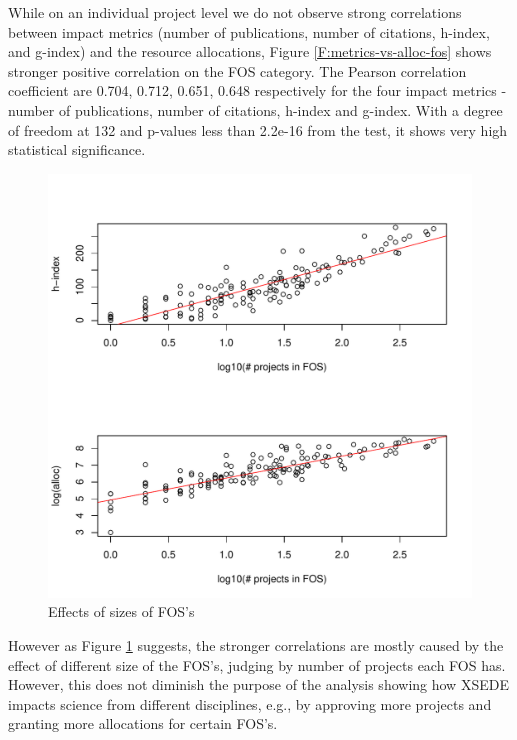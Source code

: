\documentclass{sig-alternate}
\begin{document}
While on an individual project level we do not observe strong correlations between impact metrics (number of publications, number of citations, h-index, and g-index) and the resource allocations, Figure \ref {F:metrics-vs-alloc-fos} shows stronger positive correlation on the FOS category. The Pearson correlation coefficient are 0.704, 0.712, 0.651, 0.648 respectively for the four impact metrics - number of publications, number of citations, h-index and g-index. With a degree of freedom at 132 and p-values less than 2.2e-16 from the test, it shows very high statistical significance.  
 
 
\begin{figure}[!htb] 
  \centering 
    \includegraphics[width=1.0\columnwidth]{images/05_hindexalloc_vs_nprojects_fos_trended.pdf} 
  \caption{Effects of sizes of FOS's}\label{F:hindexalloc-vs-nprojects-fos-trended} 
\end{figure} 
 
However as Figure \ref{F:hindexalloc-vs-nprojects-fos-trended} suggests, the stronger correlations are mostly caused by the effect of different size of the FOS's, judging by number of projects each FOS has. However, this does not diminish the purpose of the analysis showing how XSEDE impacts science from different disciplines, e.g., by approving more projects and granting more allocations for certain FOS's. 
 
\end{document}
